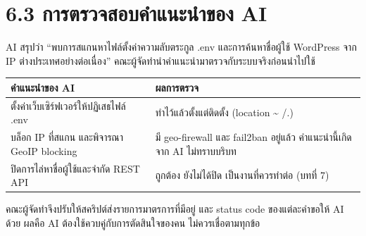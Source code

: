 \section*{6.3 การตรวจสอบคำแนะนำของ AI}

AI สรุปว่า ``พบการสแกนหาไฟล์ตั้งค่าความลับตระกูล .env และการค้นหาชื่อผู้ใช้ WordPress จาก IP ต่างประเทศอย่างต่อเนื่อง'' คณะผู้จัดทำนำคำแนะนำมาตรวจกับระบบจริงก่อนนำไปใช้

\begingroup\small\begin{longtable}[]{@{}>{\raggedright\arraybackslash}p{}>{\raggedright\arraybackslash}p{}@{}}
\toprule\noalign{}
คำแนะนำของ AI & ผลการตรวจ \\
\midrule\noalign{}
\endhead
\bottomrule\noalign{}
\endlastfoot
ตั้งค่าเว็บเซิร์ฟเวอร์ให้ปฏิเสธไฟล์ .env & ทำไว้แล้วตั้งแต่ติดตั้ง (location \textasciitilde{} /.) \\
บล็อก IP ที่สแกน และพิจารณา GeoIP blocking & มี geo-firewall และ fail2ban อยู่แล้ว คำแนะนำนี้เกิดจาก AI ไม่ทราบบริบท \\
ปิดการไล่หาชื่อผู้ใช้และจำกัด REST API & ถูกต้อง ยังไม่ได้ปิด เป็นงานที่ควรทำต่อ (บทที่ 7) \\
\end{longtable}\endgroup

คณะผู้จัดทำจึงปรับให้สคริปต์ส่งรายการมาตรการที่มีอยู่ และ status code ของแต่ละคำขอให้ AI ด้วย ผลคือ AI ต้องใช้ควบคู่กับการตัดสินใจของคน ไม่ควรเชื่อตามทุกข้อ
